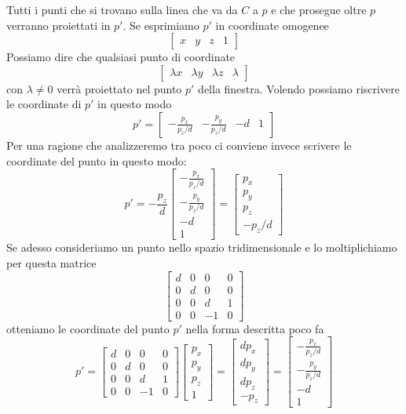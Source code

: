 Tutti i punti che si trovano sulla linea che va da $C$ a $p$ e che prosegue oltre $p$ verranno proiettati in $p'$.
Se esprimiamo $p'$ in coordinate omogenee
\[
	\begin{bmatrix}
		x & y & z & 1
	\end{bmatrix}
\]
Possiamo dire che qualsiasi punto di coordinate
\[
	\begin{bmatrix}
		\lambda x & \lambda y & \lambda z & \lambda
	\end{bmatrix}
\]
con $\lambda \neq 0$ verr\`a proiettato nel punto $p'$ della finestra. Volendo possiamo riscrivere le coordinate di $p'$
in questo modo
\[
	p' = \begin{bmatrix}
		-\displaystyle\frac{p_x}{p_z / d} &
		-\displaystyle\frac{p_y}{p_z / d} &
		-d                                &
		1
	\end{bmatrix}
\]
Per una ragione che analizzeremo tra poco ci conviene invece scrivere le coordinate del punto in questo modo:
\[
	p' = -\frac{p_z}{d}\begin{bmatrix}
		-\displaystyle\frac{p_x}{p_z / d} \\
		-\displaystyle\frac{p_y}{p_z / d} \\
		-d                                \\
		1
	\end{bmatrix} =
	\begin{bmatrix}
		p_x \\ p_y \\ p_z \\ -p_z / d
	\end{bmatrix}
\]
Se adesso consideriamo un punto nello spazio tridimensionale e lo moltiplichiamo per questa matrice
\[
	\begin{bmatrix}
		d & 0 & 0  & 0 \\
		0 & d & 0  & 0 \\
		0 & 0 & d  & 1 \\
		0 & 0 & -1 & 0
	\end{bmatrix}
\]
otteniamo le coordinate del punto $p'$ nella forma descritta poco fa
\[
	p' = \begin{bmatrix}
		d & 0 & 0  & 0 \\
		0 & d & 0  & 0 \\
		0 & 0 & d  & 1 \\
		0 & 0 & -1 & 0
	\end{bmatrix}
	\begin{bmatrix}
		p_x \\ p_y \\ p_z \\ 1
	\end{bmatrix} =
	\begin{bmatrix}
		d p_x \\ d p_y \\ d p_z \\ -p_z
	\end{bmatrix} =
	\begin{bmatrix}
		-\frac{p_x}{p_z / d} \\
		-\frac{p_y}{p_z / d} \\
		-d                   \\
		1
	\end{bmatrix}
\]
